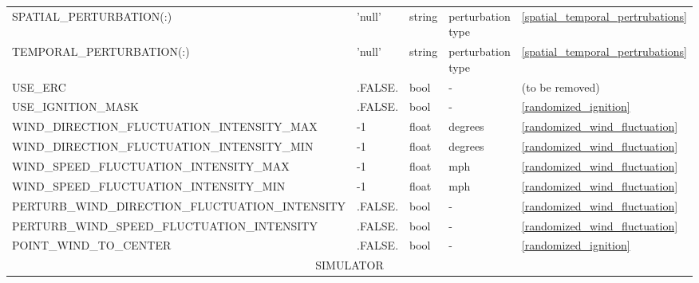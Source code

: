 \begin{landscape}
\begin{center}
\begin{longtable}{lllll}
SPATIAL\_PERTURBATION(:)                     & 'null'                     & string                 & perturbation type                  & \ref{spatial_temporal_pertrubations} \\
TEMPORAL\_PERTURBATION(:)                    & 'null'                     & string                 & perturbation type                  & \ref{spatial_temporal_pertrubations} \\
USE\_ERC                                     & .FALSE.                    & bool                   & -                                  & (to be removed)                      \\
USE\_IGNITION\_MASK                          & .FALSE.                    & bool                   & -                                  & \ref{randomized_ignition}            \\
WIND\_DIRECTION\_FLUCTUATION\_INTENSITY\_MAX & -1                         & float                  & degrees                            & \ref{randomized_wind_fluctuation}    \\
WIND\_DIRECTION\_FLUCTUATION\_INTENSITY\_MIN & -1                         & float                  & degrees                            & \ref{randomized_wind_fluctuation}    \\
WIND\_SPEED\_FLUCTUATION\_INTENSITY\_MAX     & -1                         & float                  & mph                                & \ref{randomized_wind_fluctuation}    \\
WIND\_SPEED\_FLUCTUATION\_INTENSITY\_MIN     & -1                         & float                  & mph                                & \ref{randomized_wind_fluctuation}    \\
PERTURB\_WIND\_DIRECTION\_FLUCTUATION\_INTENSITY & .FALSE.                & bool                   & -                                  & \ref{randomized_wind_fluctuation}    \\
PERTURB\_WIND\_SPEED\_FLUCTUATION\_INTENSITY & .FALSE.                    & bool                   & -                                  & \ref{randomized_wind_fluctuation}    \\
POINT\_WIND\_TO\_CENTER                      & .FALSE.                    & bool                   & -                                  & \ref{randomized_ignition}            \\
\multicolumn{5}{c}{SIMULATOR}                                                                                                                                                  \\

\end{longtable}
\end{center}
\end{landscape}
